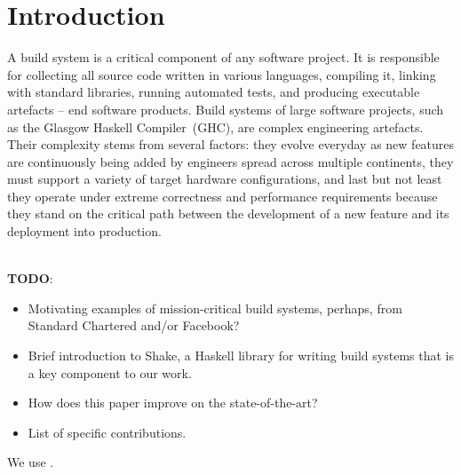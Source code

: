 \section{Introduction}

A build system is a critical component of any software project.
It is responsible for collecting all source code written in various languages,
compiling it, linking with standard libraries, running automated tests, and
producing executable artefacts -- end software products. Build systems of large
software projects, such as the Glasgow Haskell Compiler~(GHC), are complex
engineering artefacts. Their complexity stems from several factors: they evolve everyday as
new features are continuously being added by engineers spread across multiple
continents, they must support a variety of target hardware configurations, and
last but not least they operate under extreme correctness and performance
requirements because they stand on the critical path between the development of
a new feature and its deployment into production. 

~\\
\textbf{TODO}:
\begin{itemize}
  \item Motivating examples of mission-critical build systems, perhaps, from
  Standard Chartered and/or Facebook?
  \item Brief introduction to Shake, a Haskell library for writing build systems
  that is a key component to our work.
  \item How does this paper improve on the state-of-the-art?
  \item List of specific contributions.
\end{itemize}

We use \cite{mitchell:shake}.